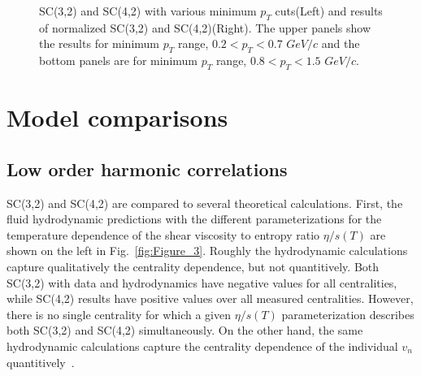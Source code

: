 \documentclass[ALICE,manyauthors]{cernphprep}
\begin{document}
\begin{figure}[p]
\begin{center}
        \caption{SC(3,2) and SC(4,2) with various minimum $p_T$ cuts(Left) and results of normalized SC(3,2) and SC(4,2)(Right). The upper panels show the results for minimum $p_T$ range, $0.2<p_T<0.7$ $GeV/c$ and the bottom panels are for minimum $p_T$ range, $0.8<p_T<1.5$ $GeV/c$.}
        \label{fig:Figure_2}
        \end{center}   
\end{figure}
 
\newpage
\section{Model comparisons}
\label{sec:theory}
\subsection{Low order harmonic correlations}
SC(3,2) and SC(4,2) are compared to several theoretical calculations. First, the fluid hydrodynamic predictions with the different parameterizations for the temperature dependence of the shear viscosity to entropy ratio $\eta/s(T)$ are shown on the left in Fig.~\ref{fig:Figure_3}. Roughly the hydrodynamic calculations capture qualitatively the centrality dependence, but not quantitively. Both SC(3,2) with data and hydrodynamics have negative values for all centralities, while SC(4,2) results have positive values over all measured centralities. However, there is no single centrality for which a given $\eta/s(T)$ parameterization describes both SC(3,2) and SC(4,2) simultaneously. On the other hand, the same hydrodynamic calculations capture the centrality dependence of the individual $v_n$ quantitively~\cite{Eskola:2015uda}.
\end{document}
